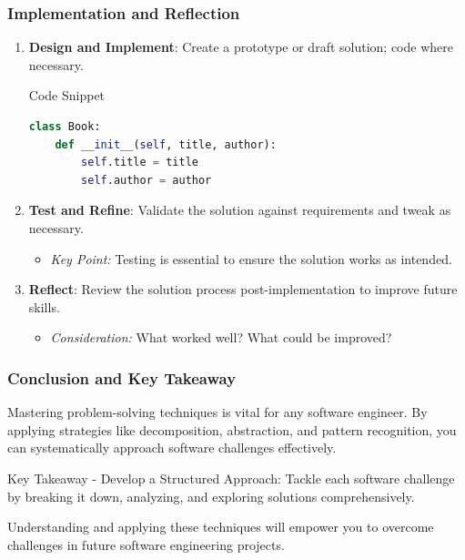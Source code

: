 \documentclass{beamer}
\begin{document}
\begin{frame}[fragile]
    \frametitle{Implementation and Reflection}
    \begin{enumerate}[resume]
        \item \textbf{Design and Implement}: Create a prototype or draft solution; code where necessary.
            \begin{block}{Code Snippet}
                \begin{lstlisting}[language=Python]
class Book:
    def __init__(self, title, author):
        self.title = title
        self.author = author
                \end{lstlisting}
            \end{block}

        \item \textbf{Test and Refine}: Validate the solution against requirements and tweak as necessary.
            \begin{itemize}
                \item \textit{Key Point:} Testing is essential to ensure the solution works as intended.
            \end{itemize}

        \item \textbf{Reflect}: Review the solution process post-implementation to improve future skills.
            \begin{itemize}
                \item \textit{Consideration:} What worked well? What could be improved?
            \end{itemize}
    \end{enumerate}
\end{frame}

\begin{frame}[fragile]
    \frametitle{Conclusion and Key Takeaway}
    Mastering problem-solving techniques is vital for any software engineer. 
    By applying strategies like decomposition, abstraction, and pattern recognition, you can systematically approach software challenges effectively.

    \begin{block}{Key Takeaway}
        - Develop a Structured Approach: Tackle each software challenge by breaking it down, analyzing, and exploring solutions comprehensively.
    \end{block}

    Understanding and applying these techniques will empower you to overcome challenges in future software engineering projects.
\end{frame}
\end{document}
